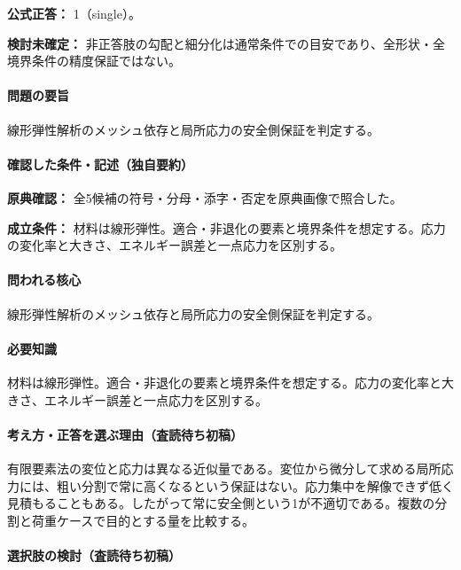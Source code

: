\textbf{公式正答：} 1（single）。

\par\textbf{検討未確定：} 非正答肢の勾配と細分化は通常条件での目安であり、全形状・全境界条件の精度保証ではない。

\paragraph{問題の要旨} 線形弾性解析のメッシュ依存と局所応力の安全側保証を判定する。

\paragraph{確認した条件・記述（独自要約）}\mbox{}\par

\noindent\textbf{原典確認：} 全5候補の符号・分母・添字・否定を原典画像で照合した。\par

\noindent\textbf{成立条件：} 材料は線形弾性。適合・非退化の要素と境界条件を想定する。応力の変化率と大きさ、エネルギー誤差と一点応力を区別する。\par

\paragraph{問われる核心} 線形弾性解析のメッシュ依存と局所応力の安全側保証を判定する。

\paragraph{必要知識} 材料は線形弾性。適合・非退化の要素と境界条件を想定する。応力の変化率と大きさ、エネルギー誤差と一点応力を区別する。

\paragraph{考え方・正答を選ぶ理由（査読待ち初稿）} 有限要素法の変位と応力は異なる近似量である。変位から微分して求める局所応力には、粗い分割で常に高くなるという保証はない。応力集中を解像できず低く見積もることもある。したがって常に安全側という1が不適切である。複数の分割と荷重ケースで目的とする量を比較する。

\paragraph{選択肢の検討（査読待ち初稿）}\mbox{}\par

